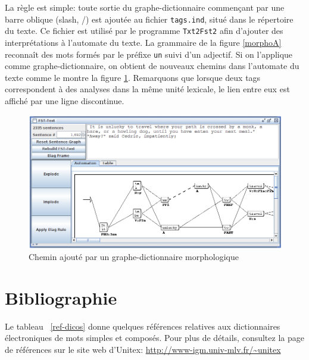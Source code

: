 \noindent La règle est simple: toute sortie du graphe-dictionnaire commençant par une barre oblique (slash, /) 
est ajoutée au fichier \verb+tags.ind+,  situé dans le répertoire du texte.
Ce fichier est utilisé par le programme \verb+Txt2Fst2+ afin d'ajouter des interprétations à
l'automate du texte. La grammaire de la figure \ref{morphoA} reconnaît des mots
formés par le préfixe \verb+un+ suivi d'un adjectif. Si on l'applique comme graphe-dictionnaire,
on obtient de nouveaux chemins dans l'automate du texte comme le montre la figure
\ref{morphoB}. Remarquons que lorsque deux tags correspondent à des analyses dans la même unité lexicale, le lien entre eux est affiché par une ligne discontinue.

\begin{figure}[!ht]
\begin{center}
\includegraphics[width=15cm]{resources/img/fig3-14b.png}
\caption{Chemin ajouté par un graphe-dictionnaire morphologique\label{morphoB}}
\end{center}
\end{figure}

\section{Bibliographie}

Le tableau ~\ref{ref-dicos} donne quelques références relatives aux dictionnaires électroniques de
mots simples et composés. Pour plus de détails, consultez la page de références sur le site
web d’Unitex: \url{http://www-igm.univ-mlv.fr/~unitex}

